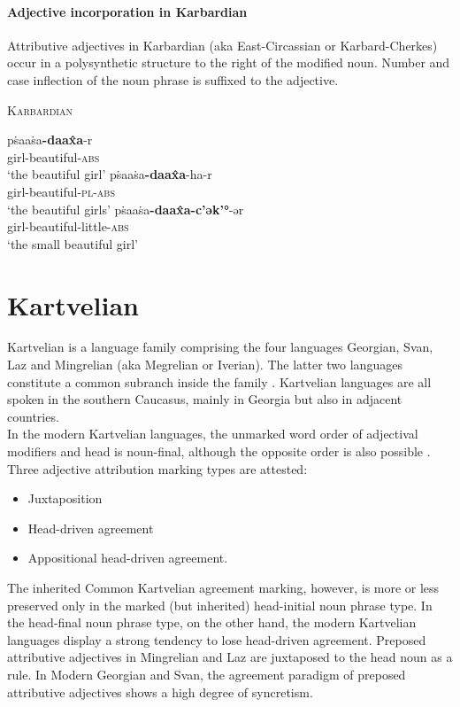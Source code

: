 \paragraph{Adjective incorporation in Karbardian}
Attributive adjectives in Karbardian (aka East-Circassian or Karbard-Cherkes) occur in a polysynthetic structure to the right of the modified noun. Number and case inflection of the noun phrase is suffixed to the adjective.
\newpage
\begin{exe}
\ex \textsc{Karbardian} \citep[295]{colarusso1989}
\begin{xlist}
\ex	
\gll	pṡaaṡa\textbf{-daax̂a}-r\\
	girl-beautiful-\textsc{abs}\\
\glt	‘the beautiful girl’
\ex
\gll	pṡaaṡa\textbf{-daax̂a}-ha-r\\
	girl-beautiful-\textsc{pl}-\textsc{abs}\\
\glt	‘the beautiful girls’
\ex
\gll	pṡaaṡa\textbf{-daax̂a-c'ək'°}-ər\\
	girl-beautiful-little-\textsc{abs}\\
\glt	‘the small beautiful girl’
\end{xlist}
\end{exe}

\section{Kartvelian}\label{kartvelian synchr}
Kartvelian is a language family comprising the four languages Georgian, Svan, Laz and Mingrelian (aka Megrelian or Iverian). The latter two languages constitute a common subranch inside the family \cite[220]{salminen2007}. Kartvelian languages are all spoken in the southern Caucasus, mainly in Georgia but also in adjacent countries.\\

\noindent In the modern Kartvelian languages, the unmarked word order of adjectival modifiers and head is noun-final, although the opposite order is also possible \citep[56]{harris1991a}.\\

\noindent Three adjective attribution marking types are attested:
\begin{itemize}
\item Juxtaposition
\item Head-driven agreement
\item Appositional head-driven agreement.
\end{itemize}
The inherited Common Kartvelian agreement marking, however, is more or less preserved only in the marked (but inherited) head-initial noun phrase type. In the head-final noun phrase type, on the other hand, the modern Kartvelian languages display a strong tendency to lose head-driven agreement. Preposed attributive adjectives in Mingrelian and Laz are juxtaposed to the head noun as a rule. In Modern Georgian and Svan, the agreement paradigm of preposed attributive adjectives shows a high degree of syncretism.

